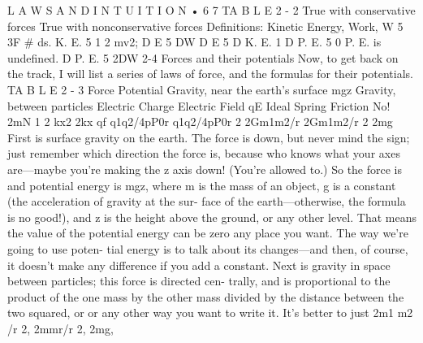 \documentclass[10pt,oneside]{article}
\begin{document}
L A W S  A N D  I N T U I T I O N • 6 7 TA B L E  2 - 2 True with conservative forces True with nonconservative forces Definitions: Kinetic Energy, Work, W 5 3F \# ds. K. E. 5 1 2  mv2; D E 5 DW D E 5 D K. E. 1 D P. E. 5 0 P. E. is undefined. D P. E. 5 2DW 2-4 Forces and their potentials Now, to get back on the track, I will list a series of laws of force, and the formulas for their potentials. TA B L E 2 - 3 Force Potential Gravity, near the earth’s surface mgz Gravity, between particles Electric Charge Electric Field qE Ideal Spring Friction No! 2mN 1 2 kx2 2kx qf q1q2/4pP0r q1q2/4pP0r 2 2Gm1m2/r 2Gm1m2/r 2 2mg First is surface gravity on the earth. The force is down, but never mind the sign; just remember which direction the force is, because who knows what your axes are---maybe you’re making the z axis down! (You’re allowed to.) So the force is and potential energy is mgz, where m is the mass of an object, g is a constant (the acceleration of gravity at the sur- face of the earth---otherwise, the formula is no good!), and z is the height above the ground, or any other level. That means the value of the potential energy can be zero any place you want. The way we’re going to use poten- tial energy is to talk about its changes---and then, of course, it doesn’t make any difference if you add a constant. Next is gravity in space between particles; this force is directed cen- trally, and is proportional to the product of the one mass by the other mass divided by the distance between the two squared, or or any other way you want to write it. It’s better to just 2m1 m2 /r 2, 2mmr/r 2, 2mg,\par
\end{document}
